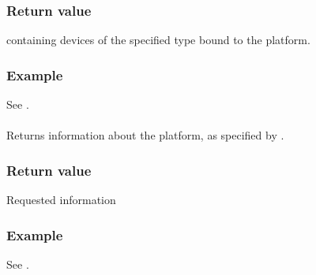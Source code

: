 \documentclass[letterpaper,10pt,english]{sphinxmanual}
\begin{document}
\subsubsection*{Return value}

 containing devices of the specified type bound to the
platform.
\subsubsection*{Example}

See {\hyperref[\detokenize{programming-interface/runtime/platform:platform-example}]{}}.


\paragraph{}
\label{\detokenize{programming-interface/runtime/platform:get-info}}
\begin{sphinxVerbatim}[commandchars=\\\{\}]
   
    
\end{sphinxVerbatim}

Returns information about the platform, as specified by .
\subsubsection*{Return value}

Requested information
\subsubsection*{Example}

See {\hyperref[\detokenize{programming-interface/runtime/platform:platform-example}]{}}.


\paragraph{}
\label{\detokenize{programming-interface/runtime/platform:has-extension}}
\begin{sphinxVerbatim}[commandchars=\\\{\}]
    
\end{sphinxVerbatim}
\end{document}
